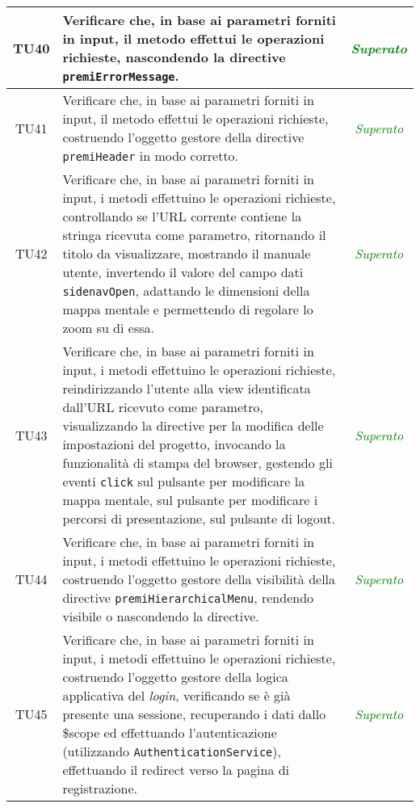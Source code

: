 \begin{longtable}{|c|>{}m{8cm}|c|}
\hypertarget{TU40}{TU40} & Verificare che, in base ai parametri forniti in input, il metodo effettui le operazioni richieste, nascondendo la directive \texttt{premiErrorMessage}\finaleTestUnita{}. & \textcolor{Green}{\textit{Superato}}\\ \hline
\hypertarget{TU41}{TU41} & Verificare che, in base ai parametri forniti in input, il metodo effettui le operazioni richieste, costruendo l'oggetto gestore della directive \texttt{premiHeader} in modo corretto\finaleTestUnita{}. & \textcolor{Green}{\textit{Superato}}\\ \hline
\hypertarget{TU42}{TU42} & Verificare che, in base ai parametri forniti in input, i metodi effettuino le operazioni richieste, controllando se l'URL corrente contiene la stringa ricevuta come parametro, ritornando il titolo da visualizzare, mostrando il manuale utente, invertendo il valore del campo dati \texttt{sidenavOpen}, adattando le dimensioni della mappa mentale e permettendo di regolare lo zoom su di essa\finaleTestUnita{}. & \textcolor{Green}{\textit{Superato}}\\ \hline
\hypertarget{TU43}{TU43} & Verificare che, in base ai parametri forniti in input, i metodi effettuino le operazioni richieste, reindirizzando l'utente alla view identificata dall'URL ricevuto come parametro, visualizzando la directive per la modifica delle impostazioni del progetto, invocando la funzionalità di stampa del browser, gestendo gli eventi \texttt{click} sul pulsante per modificare la mappa mentale, sul pulsante per modificare i percorsi di presentazione, sul pulsante di logout\finaleTestUnita{}. & \textcolor{Green}{\textit{Superato}}\\ \hline
\hypertarget{TU44}{TU44} & Verificare che, in base ai parametri forniti in input, i metodi effettuino le operazioni richieste, costruendo l'oggetto gestore della visibilità della directive \texttt{premiHierarchicalMenu}, rendendo visibile o nascondendo la directive\finaleTestUnita{}. & \textcolor{Green}{\textit{Superato}}\\ \hline
\hypertarget{TU45}{TU45} & Verificare che, in base ai parametri forniti in input, i metodi effettuino le operazioni richieste, costruendo l'oggetto gestore della logica applicativa del \textit{login}, verificando se è già presente una sessione, recuperando i dati dallo \$scope ed effettuando l'autenticazione (utilizzando \texttt{AuthenticationService}), effettuando il redirect verso la pagina di registrazione\finaleTestUnita{}. & \textcolor{Green}{\textit{Superato}}\\ \hline

\end{longtable}

